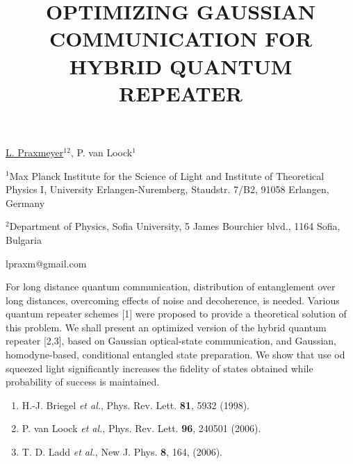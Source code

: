 \title{OPTIMIZING GAUSSIAN COMMUNICATION FOR HYBRID QUANTUM REPEATER}

\underline{L. Praxmeyer}$^{12}$, P. van Loock$^1$  

{\normalsize{\vspace{-4mm} $^1$Max Planck Institute for the Science of Light and
Institute of Theoretical Physics I, University Erlangen-Nuremberg,
Staudstr. 7/B2, 91058 Erlangen, Germany

\vspace{-4mm} $^2$Department of Physics, Sofia University, 5 James
Bourchier blvd., 1164 Sofia, Bulgaria

\email lpraxm@gmail.com}}

For long distance quantum communication, distribution of
entanglement over long distances, overcoming effects of noise and
decoherence, is needed. Various quantum repeater schemes [1] were
proposed to provide a theoretical solution of this problem. We shall
present an optimized version of the hybrid quantum repeater [2,3],
based on Gaussian optical-state communication, and Gaussian,
homodyne-based, conditional entangled state preparation. We show
that use od squeezed light significantly increases the fidelity of
states obtained while probability of success is maintained.

\vspace{-4mm} {\normalsize \begin{enumerate} \item H.-J. Briegel {\sl et
al.}, Phys. Rev. Lett. \textbf{81}, 5932 (1998). \item P. van Loock
{\sl et al.}, Phys. Rev. Lett. \textbf{96}, 240501 (2006).
\item T. D. Ladd {\sl et al.}, New J. Phys. \textbf{8},
164, (2006).
\end{enumerate}
}

\vspace{\baselineskip}